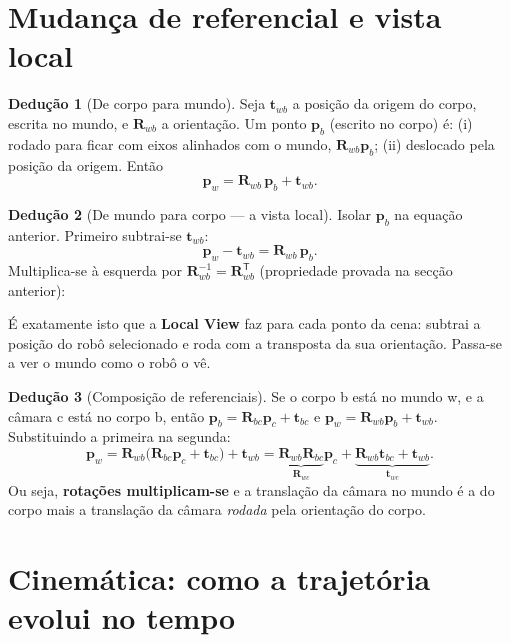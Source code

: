 \documentclass[11pt,a4paper]{article}
\newcommand{\vv}[1]{\mathbf{#1}}              %
\newcommand{\Rot}{\mathbf{R}}
\newcommand{\T}{^{\mathsf{T}}}
\theoremstyle{definition}
\newtheorem{deducao}{Dedução}[section]
\newcommand{\resultado}[1]{\begin{center}\fbox{\parbox{0.9\textwidth}{\centering #1}}\end{center}}
\begin{document}
\section{Mudança de referencial e vista local}

\begin{deducao}[De corpo para mundo]\label{ded:pose}
Seja $\vv{t}_{wb}$ a posição da origem do corpo, escrita no mundo, e $\Rot_{wb}$ a orientação. Um ponto $\vv{p}_b$ (escrito no corpo) é: (i) rodado para ficar com eixos alinhados com o mundo, $\Rot_{wb}\vv{p}_b$; (ii) deslocado pela posição da origem. Então
\begin{equation}
\vv{p}_w=\Rot_{wb}\,\vv{p}_b+\vv{t}_{wb}.
\end{equation}
\end{deducao}

\begin{deducao}[De mundo para corpo --- a vista local]
Isolar $\vv{p}_b$ na equação anterior. Primeiro subtrai-se $\vv{t}_{wb}$:
\[
\vv{p}_w-\vv{t}_{wb}=\Rot_{wb}\,\vv{p}_b .
\]
Multiplica-se à esquerda por $\Rot_{wb}^{-1}=\Rot_{wb}\T$ (propriedade provada na secção anterior):
\end{deducao}
\resultado{$\vv{p}_b=\Rot_{wb}\T\,(\vv{p}_w-\vv{t}_{wb})$}

É exatamente isto que a \textbf{Local View} faz para cada ponto da cena: subtrai a posição do robô selecionado e roda com a transposta da sua orientação. Passa-se a ver o mundo como o robô o vê.

\begin{deducao}[Composição de referenciais]
Se o corpo b está no mundo w, e a câmara c está no corpo b, então $\vv{p}_b=\Rot_{bc}\vv{p}_c+\vv{t}_{bc}$ e $\vv{p}_w=\Rot_{wb}\vv{p}_b+\vv{t}_{wb}$. Substituindo a primeira na segunda:
\[
\vv{p}_w=\Rot_{wb}\big(\Rot_{bc}\vv{p}_c+\vv{t}_{bc}\big)+\vv{t}_{wb}
=\underbrace{\Rot_{wb}\Rot_{bc}}_{\Rot_{wc}}\vv{p}_c+\underbrace{\Rot_{wb}\vv{t}_{bc}+\vv{t}_{wb}}_{\vv{t}_{wc}} .
\]
Ou seja, \textbf{rotações multiplicam-se} e a translação da câmara no mundo é a do corpo mais a translação da câmara \emph{rodada} pela orientação do corpo.
\end{deducao}

\section{Cinemática: como a trajetória evolui no tempo}
\end{document}
